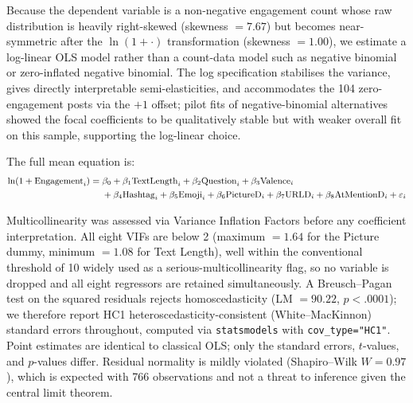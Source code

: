 \documentclass[12pt,a4paper]{article}
\begin{document}
Because the dependent variable is a non-negative engagement count whose raw distribution is heavily right-skewed (skewness $=7.67$) but becomes near-symmetric after the $\ln(1+\cdot)$ transformation (skewness $=1.00$), we estimate a log-linear OLS model rather than a count-data model such as negative binomial or zero-inflated negative binomial. The log specification stabilises the variance, gives directly interpretable semi-elasticities, and accommodates the 104 zero-engagement posts via the $+1$ offset; pilot fits of negative-binomial alternatives showed the focal coefficients to be qualitatively stable but with weaker overall fit on this sample, supporting the log-linear choice.

The full mean equation is:
\begin{equation}\small
\begin{aligned}
\ln(1+\text{Engagement}_i) ={}& \beta_0 + \beta_1\text{TextLength}_i + \beta_2\text{Question}_i + \beta_3\text{Valence}_i \\
& + \beta_4\text{Hashtag}_i + \beta_5\text{Emoji}_i + \beta_6\text{PictureD}_i + \beta_7\text{URLD}_i + \beta_8\text{AtMentionD}_i + \varepsilon_i
\end{aligned}
\end{equation}

Multicollinearity was assessed via Variance Inflation Factors before any coefficient interpretation. All eight VIFs are below 2 (maximum $=1.64$ for the Picture dummy, minimum $=1.08$ for Text Length), well within the conventional threshold of 10 widely used as a serious-multicollinearity flag, so no variable is dropped and all eight regressors are retained simultaneously. A Breusch--Pagan test on the squared residuals rejects homoscedasticity (LM $=90.22$, $p<.0001$); we therefore report HC1 heteroscedasticity-consistent (White--MacKinnon) standard errors throughout, computed via \texttt{statsmodels} with \texttt{cov\_type="HC1"}. Point estimates are identical to classical OLS; only the standard errors, $t$-values, and $p$-values differ. Residual normality is mildly violated (Shapiro--Wilk $W=0.97$), which is expected with 766 observations and not a threat to inference given the central limit theorem.
\end{document}
